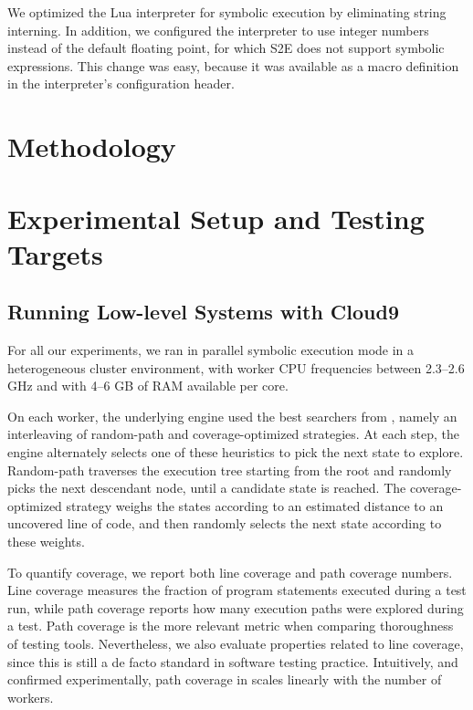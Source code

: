 We optimized the Lua interpreter for symbolic execution by eliminating string interning.  In addition, we configured the interpreter to use integer numbers instead of the default floating point, for which S2E does not support symbolic expressions.  This change was easy, because it was available as a macro definition in the interpreter's configuration header.


\section{Methodology}
\label{sec:eval:methodology}


\section{Experimental Setup and Testing Targets}
\label{sec:eval:targets}

\subsection{Running Low-level Systems with Cloud9}

For all our \cnine experiments, we ran \cnine in parallel symbolic execution mode in a heterogeneous cluster environment, with worker CPU frequencies between 2.3--2.6 GHz and with 4--6 GB of RAM available per core.

On each worker, the underlying \klee engine used the best searchers from \cite{klee}, namely an interleaving of random-path and coverage-optimized strategies. At each step, the engine alternately selects one of these heuristics to pick the next state to explore. Random-path traverses the execution tree starting from the root and randomly picks the next descendant node, until a candidate state is reached. The coverage-optimized strategy weighs the states according to an estimated distance to an uncovered line of code, and then randomly selects the next state according to these weights.

To quantify coverage, we report both line coverage and path coverage numbers. Line coverage measures the fraction of program statements executed during a test run, while path coverage reports how many execution paths were explored during a test. Path coverage is the more relevant metric when comparing thoroughness of testing tools.  Nevertheless, we also evaluate properties related to line coverage, since this is still a de facto standard in software testing practice. Intuitively, and confirmed experimentally, path coverage in \cnine scales linearly with the number of workers.


